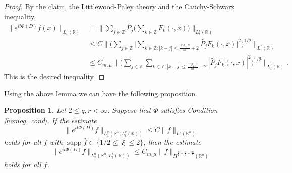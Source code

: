 \documentclass[11pt,reqno]{amsart}
\DeclareMathOperator{\supp}{supp}
\theoremstyle{plain}
\newtheorem{prop}[thm]{Proposition}
\theoremstyle{definition}
\theoremstyle{remark}
\numberwithin{equation}{section}
\begin{document}
\begin{proof}
By the claim, the Littlewood-Paley theory and the Cauchy-Schwarz inequality,
    \begin{equation*}
    \begin{aligned}
    \big\|e^{it\Phi(D)} f(x) \big\|_{L_t^r(\mathbb R)}
    &= \Big\| \sum_{j \in \mathbb{Z}} \widetilde{P_j} \Big( \sum_{k \in \mathbb Z} F_k(\cdot,x) \Big) \Big\|_{L_t^r(\mathbb R)} \\
    &\leq C \Big\| \Big(\sum_{j \in \mathbb{Z}} \Big| \sum_{k \in \mathbb Z: |k -j| \le  \frac{\log_2 \mu}{m}+2} \widetilde{P_j} F_k(\cdot,x) \Big|^2\Big)^{1/2} \Big\|_{L_t^r(\mathbb R)} \\
    &\leq C_{m,\mu} \Big\| \Big( \sum_{j \in \mathbb{Z}} \sum_{k \in \mathbb Z: |k -j| \le  \frac{\log_2 \mu}{m}+2} | \widetilde{P_j} F_k(\cdot,x)|^2\Big)^{1/2} \Big\|_{L_t^r(\mathbb R)}.
    \end{aligned}
    \end{equation*}
This is the desired inequality.
\end{proof}


Using the above lemma we can have the following proposition.
\begin{prop}\label{LP_prop}
Let $2 \leq q,r < \infty$. Suppose that $\Phi$ satisfies Condition \ref{homog_cond}.
If the estimate
    \begin{equation}\label{LP_prop_supp}
    \|e^{it\Phi(D)} f \|_{L_x^q(\mathbb R^n;L_t^r(\mathbb R))}
    \leq C \| f\|_{L^2(\mathbb R^n)}
    \end{equation}
holds for all $f$ with $\supp \hat f \subset \{1/2 \le |\xi| \le 2 \}$, then the estimate
    $$
    \|e^{it\Phi(D)} f \|_{L_x^q(\mathbb R^n;L_t^r(\mathbb R))}
    \leq C_{m,\mu} \| f\|_{\dot{H}^{\frac{n}{2}-\frac{n}{q}-\frac{m}{r}}(\mathbb R^n)}
    $$
holds for all $f$.
\end{prop}
\end{document}
